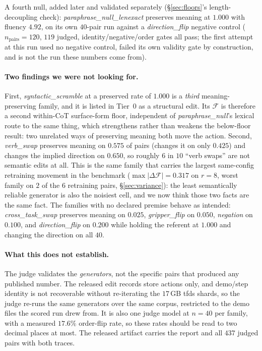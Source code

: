 A fourth null, added later and validated separately (\S\ref{sec:floors}'s length-decoupling check): \emph{paraphrase\_null\_lenexact} preserves meaning at $1.000$ with fluency $4.92$, on its own $40$-pair run against a \emph{direction\_flip} negative control ($n_{\text{pairs}}{=}120$, $119$ judged, identity/negative/order gates all pass; the first attempt at this run used no negative control, failed its own validity gate by construction, and is not the run these numbers come from).

\paragraph{Two findings we were not looking for.} First, \emph{syntactic\_scramble} at a preserved rate of $1.000$ is a \emph{third} meaning-preserving family, and it is listed in Tier~0 as a structural edit. Its $\mathcal{F}$ is therefore a second within-CoT surface-form floor, independent of \emph{paraphrase\_null}'s lexical route to the same thing, which strengthens rather than weakens the below-floor result: two unrelated ways of preserving meaning both move the action. Second, \emph{verb\_swap} preserves meaning on $0.575$ of pairs (changes it on only $0.425$) and changes the implied direction on $0.650$, so roughly $6$ in $10$ ``verb swaps'' are not semantic edits at all. This is the same family that carries the largest same-config retraining movement in the benchmark ($\max|\Delta\mathcal{F}| = 0.317$ on $r{=}8$, worst family on $2$ of the $6$ retraining pairs, \S\ref{sec:variance}): the least semantically reliable generator is also the noisiest cell, and we now think those two facts are the same fact. The families with no declared premise behave as intended: \emph{cross\_task\_swap} preserves meaning on $0.025$, \emph{gripper\_flip} on $0.050$, \emph{negation} on $0.100$, and \emph{direction\_flip} on $0.200$ while holding the referent at $1.000$ and changing the direction on all $40$.

\paragraph{What this does not establish.} The judge validates the \emph{generators}, not the specific pairs that produced any published number. The released edit records store actions only, and demo/step identity is not recoverable without re-iterating the $17$\,GB tfds shards, so the judge re-runs the same generators over the same corpus, restricted to the demo files the scored run drew from. It is also one judge model at $n{=}40$ per family, with a measured $17.6\%$ order-flip rate, so these rates should be read to two decimal places at most. The released artifact carries the report and all $437$ judged pairs with both traces.

